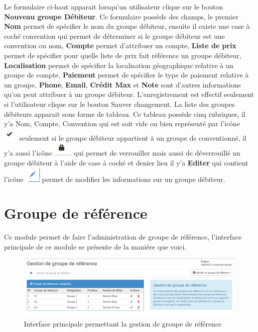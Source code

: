 \documentclass[12pt,a4paper]{report}
\begin{document}
Le formulaire ci-haut apparait lorsqu'un utilisateur clique sur le bouton \textbf{Nouveau groupe Débiteur}. Ce formulaire possède des champs, le premier \textbf{Nom} permet de spécifier le nom du groupe débiteur, ensuite il existe une case à coché convention qui permet de déterminer si le groupe débiteur est une convention ou nom, \textbf{Compte }permet d'attribuer un compte, \textbf{Liste de prix}  permet de spécifier pour quelle liste de prix fait référence un groupe débiteur, \textbf{Localisation} permet de spécifier la localisation géographique relative à un groupe de compte, \textbf{Paiement} permet de spécifier le type de paiement relative à un groupe,\textbf{ Phone}, \textbf{Email}, \textbf{Crédit Max }et \textbf{Note} sont d'autres informations qu'on peut attribuer à un groupe débiteur.
L'enregistrement est effectif seulement si l'utilisateur clique sur le bouton Sauver changement.
La liste des groupes débiteurs apparait sous forme de tableau. Ce tableau possède cinq rubriques, il y'a Nom, Compte, Convention qui est soit vide ou bien représenté par l'icône \includegraphics[scale=0.7]{pic/IconOk.png}  seulement si le groupe débiteur appartient à un groupe de conventionné,  il y'a aussi l'icône \includegraphics[scale=0.7]{pic/Locked.png}  qui permet de verrouiller mais aussi de déverrouillé un groupe débiteur à l'aide de case à coché et denier lieu il y'a \textbf{Editer} qui contient l'icône \includegraphics[scale=0.7]{pic/EditUser.png}   permet de modifier les informations sur un groupe débiteur.

\newpage
\section{Groupe de référence}
Ce module permet de faire l'administration de groupe de référence, l'interface principale de ce module se présente de la manière que voici.

\begin{figure}[h]
\begin{center}
\includegraphics[width=14cm]{pic/GestGrREF.png}
\end{center}
\caption{Interface principale permettant la gestion de groupe de référence}
\label{Interface principale permettant la gestion de groupe de référence}
\end{figure}
\end{document}
